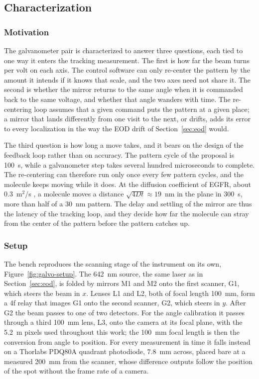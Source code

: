 \documentclass{article}
\begin{document}
\subsection{Characterization}

\subsubsection{Motivation}

The galvanometer pair is characterized to answer three questions, each tied to one way it enters
the tracking measurement. The first is how far the beam turns per volt on each axis. The control
software can only re-center the pattern by the amount it intends if it knows that scale, and the
two axes need not share it. The second is whether the mirror returns to the same angle when it
is commanded back to the same voltage, and whether that angle wanders with time. The
re-centering loop assumes that a given command puts the pattern at a given place; a mirror that
lands differently from one visit to the next, or drifts, adds its error to every localization in
the way the EOD drift of Section~\ref{sec:eod} would.

The third question is how long a move takes, and it bears on the design of the feedback loop
rather than on accuracy. The pattern cycle of the proposal is 100~\textmu s, while a galvanometer
step takes several hundred microseconds to complete. The re-centering can therefore run only once
every few pattern cycles, and the molecule keeps moving while it does. At the diffusion
coefficient of EGFR, about 0.3~\textmu m$^2$/s \cite{becerraQuantifyingProteinInteractions2024},
a molecule moves a distance $\sqrt{4Dt} \approx 19$~nm in the plane in 300~\textmu s, more than
half of a 30~nm pattern. The delay and settling of the mirror are thus the latency of the
tracking loop, and they decide how far the molecule can stray from the center of the pattern
before the pattern catches up.

\subsubsection{Setup}

The bench reproduces the scanning stage of the instrument on its own,
Figure~\ref{fig:galvo-setup}. The 642~nm source, the same laser as in Section~\ref{sec:eod}, is
folded by mirrors M1 and M2 onto the first scanner, G1, which steers the beam in $x$. Lenses L1
and L2, both of focal length 100~mm, form a 4f relay that images G1 onto the second scanner, G2,
which steers in $y$. After G2 the beam passes to one of two detectors. For the angle calibration
it passes through a third 100~mm lens, L3, onto the camera at its focal plane, with the
5.2~\textmu m pixels used throughout this work; the 100~mm focal length is then the conversion from
angle to position. For every measurement in time it falls instead on a Thorlabs PDQ80A quadrant
photodiode, 7.8~mm across, placed bare at a measured 200~mm from the scanner, whose difference outputs follow
the position of the spot without the frame rate of a camera.
\end{document}
